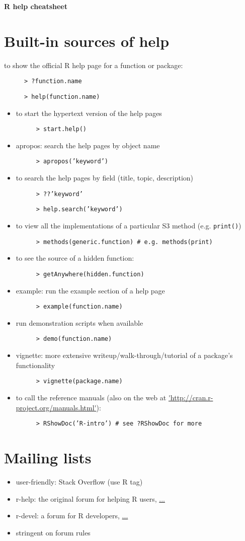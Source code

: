 \documentclass{article}
\newcommand{\rstyle}[1] {\begin{description} \item[]\texttt{>
        #1} \end{description}}
\begin{document}
\singlespacing



\begin{multicols}{2}

{\huge \bf{R help cheatsheet}}
\footnotesize

\section{Built-in sources of help}

to show the official R help page for a function or package:
\rstyle{?function.name}
\rstyle{help(function.name)}
\begin{itemize}
\item to start the hypertext version of the help pages
\rstyle{start.help()}
\item apropos: search the help pages by object name
\rstyle{apropos('keyword')}

\item to search the help pages by field (title, topic, description)
\rstyle{??'keyword'}
\rstyle{help.search('keyword')}

\item to view all the implementations of a particular S3 method (e.g. \texttt{print()})
\rstyle{methods(generic.function) \# e.g. methods(print)}

\item to see the source of a hidden function:
\rstyle{getAnywhere(hidden.function)}
  
\item example: run the example section of a help page
\rstyle{example(function.name)}

\item run demonstration scripts when available
\rstyle{demo(function.name)}

\item vignette: more extensive writeup/walk-through/tutorial of a package's functionality
\rstyle{vignette(package.name)}

\item to call the reference manuals (also on the web at \url{'http://cran.r-project.org/manuals.html'}):
\rstyle{RShowDoc('R-intro') \# see ?RShowDoc for more}
\end{itemize}

\section{Mailing lists}
\begin{itemize}
\item user-friendly: Stack Overflow (use R tag)
\item r-help: the original forum for helping R users, \url{...}
\item r-devel: a forum for R developers, \url{...}
\item stringent on forum rules
\end{itemize}



\end{multicols}
\end{document}
